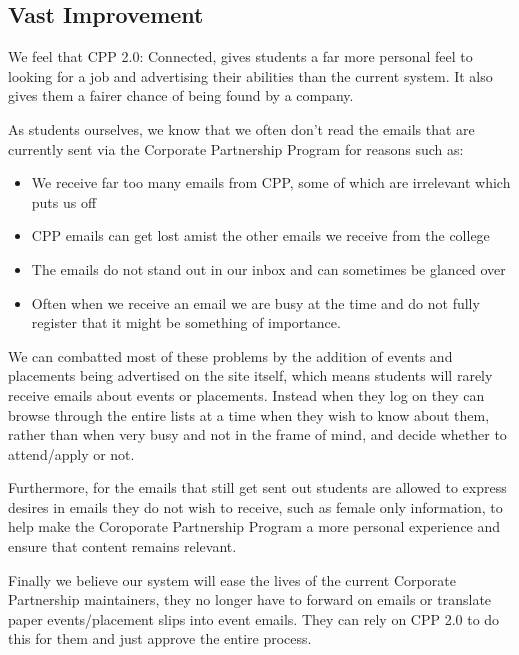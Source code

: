 \subsection{Vast Improvement}
We feel that CPP 2.0: Connected, gives students a far more personal feel to looking for a job and advertising their abilities than the current system. It also gives them a fairer chance of being found by a company.

As students ourselves, we know that we often don't read the emails that are currently sent via the Corporate Partnership Program for reasons such as:
\begin{itemize}
  \item We receive far too many emails from CPP, some of which are irrelevant which puts us off
  \item CPP emails can get lost amist the other emails we receive from the college
  \item The emails do not stand out in our inbox and can sometimes be glanced over
  \item Often when we receive an email we are busy at the time and do not fully register that it might be something of importance.
\end{itemize} 

We can combatted most of these problems by the addition of events and placements being advertised on the site itself, which means students will rarely receive emails about events or placements. Instead when they log on they can browse through the entire lists at a time when they wish to know about them, rather than when very busy and not in the frame of mind, and decide whether to attend/apply or not.

Furthermore, for the emails that still get sent out students are allowed to express desires in emails they do not wish to receive, such as female only information, to help make the Coroporate Partnership Program a more personal experience and ensure that content remains relevant. 

Finally we believe our system will ease the lives of the current Corporate Partnership maintainers, they no longer have to forward on emails or translate paper events/placement slips into event emails. They can rely on CPP 2.0 to do this for them and just approve the entire process.